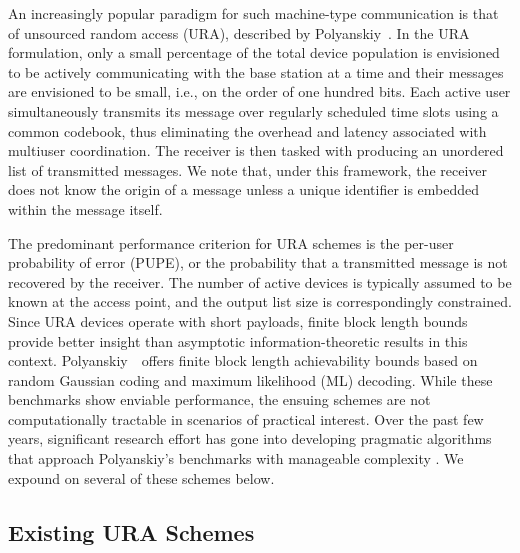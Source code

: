 \documentclass[journal]{IEEEtran}
\begin{document}
An increasingly popular paradigm for such machine-type communication is that of unsourced random access (URA), described by Polyanskiy~\cite{polyanskiy2017perspective}. 
In the URA formulation, only a small percentage of the total device population is envisioned to be actively communicating with the base station at a time and their messages are envisioned to be small, i.e., on the order of one hundred bits. 
Each active user simultaneously transmits its message over regularly scheduled time slots using a common codebook, thus eliminating the overhead and latency associated with multiuser coordination. 
The receiver is then tasked with producing an unordered list of transmitted messages.  
We note that, under this framework, the receiver does not know the origin of a message unless a unique identifier is embedded within the message itself.

The predominant performance criterion for URA schemes is the per-user probability of error (PUPE), or the probability that a transmitted message is not recovered by the receiver.
The number of active devices is typically assumed to be known at the access point, and the output list size is correspondingly constrained.
Since URA devices operate with short payloads, finite block length bounds provide better insight than asymptotic information-theoretic results in this context.
Polyanskiy~\cite{polyanskiy2017perspective}~offers finite block length achievability bounds based on random Gaussian coding and maximum likelihood (ML) decoding.
While these benchmarks show enviable performance, the ensuing schemes are not computationally tractable in scenarios of practical interest.  
Over the past few years, significant research effort has gone into developing pragmatic algorithms that approach Polyanskiy's benchmarks with manageable complexity \cite{ordentlich2017isit, vem2017user, pradhan2020sparse, marshakov2019polar, pradhan2019polar, ahmadi2021random, amalladinne2019coded, fengler2019sparcs, amalladinne2020unsourced, han2021sparse, calderbank2018chirrup}.   
We expound on several of these schemes below.

\subsection{Existing URA Schemes}
\end{document}
